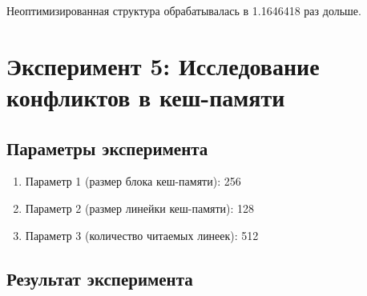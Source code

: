 \documentclass[a4paper,oneside,14pt]{extarticle}
\begin{document}
Неоптимизированная структура обрабатывалась в 1.1646418 раз дольше.







\newpage

\section{Эксперимент 5: Исследование конфликтов в кеш-памяти}

\subsection{Параметры эксперимента}

\begin{enumerate}
    \item Параметр 1 (размер блока кеш-памяти): 256
    \item Параметр 2 (размер линейки кеш-памяти): 128
    \item Параметр 3 (количество читаемых линеек): 512
\end{enumerate}

\subsection{Результат эксперимента}
\end{document}
